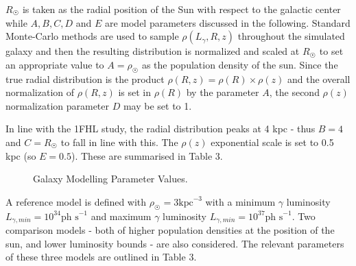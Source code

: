 \documentclass{PoS}
\begin{document}
$R_{\astrosun}$ is taken as the radial position of the Sun with respect to the galactic center while $A, B, C, D$ and $E$ are model parameters discussed in the following. Standard Monte-Carlo methods are used to sample $\rho(L_{\gamma}, R, z)$ throughout the simulated galaxy and then the resulting distribution is normalized and scaled at $R_{\astrosun}$ to set an appropriate value to $A = \rho_{\astrosun}$ as the population density of the sun. Since the true radial distribution is the product $\rho(R, z) = \rho(R) \times \rho(z)$ and the overall normalization of $\rho(R, z)$ is set in $\rho(R)$ by the parameter $A$, the second $\rho(z)$ normalization parameter $D$ may be set to 1.

In line with the 1FHL study, the radial distribution peaks at 4 kpc - thus $B = 4$ and $C = R_{\astrosun}$ to fall in line with this. The $\rho(z)$ exponential scale is set to 0.5 kpc (so $E=0.5$).  These are summarised in Table 3. 

\begin{figure}
\centering
{}
\caption{Galaxy Modelling Parameter Values.}
\end{figure}

A reference model is defined with $\rho_{\astrosun} = 3 \text{kpc}^{-3}$ with a minimum $\gamma$ luminosity $L_{\gamma, min} = 10^{34} \text{ph s}^{-1}$ and maximum $\gamma$ luminosity $L_{\gamma, min} = 10^{37} \text{ph s}^{-1}$. Two comparison models - both of higher population densities at the position of the sun, and lower luminosity bounds - are also considered. The relevant parameters of these three models are outlined in Table 3.

\begin{table}
\centering
{}
\caption{Parameters for 10 - 500 GeV Galaxy Population Simulations.}
\end{table}
\end{document}
